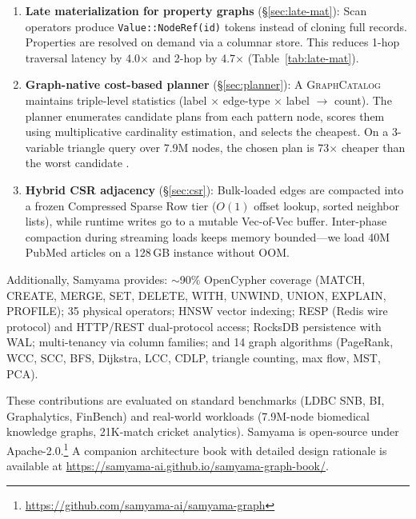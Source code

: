 \documentclass[sigconf, nonacm]{acmart}
\begin{document}
\begin{enumerate}[leftmargin=*]
  \item \textbf{Late materialization for property graphs} (\S\ref{sec:late-mat}):
    Scan operators produce \texttt{Value::NodeRef(id)} tokens instead of cloning full records.
    Properties are resolved on demand via a columnar store.
    This reduces 1-hop traversal latency by 4.0$\times$ and 2-hop by 4.7$\times$ (Table~\ref{tab:late-mat}).

  \item \textbf{Graph-native cost-based planner} (\S\ref{sec:planner}):
    A \textsc{GraphCatalog} maintains triple-level statistics (label $\times$ edge-type $\times$ label $\rightarrow$ count).
    The planner enumerates candidate plans from each pattern node, scores them using multiplicative cardinality estimation, and selects the cheapest.
    On a 3-variable triangle query over 7.9M nodes, the chosen plan is 73$\times$ cheaper than the worst candidate .

  \item \textbf{Hybrid CSR adjacency} (\S\ref{sec:csr}):
    Bulk-loaded edges are compacted into a frozen Compressed Sparse Row tier ($O(1)$ offset lookup, sorted neighbor lists),
    while runtime writes go to a mutable Vec-of-Vec buffer.
    Inter-phase compaction during streaming loads keeps memory bounded---we load 40M PubMed articles on a 128\,GB instance without OOM.
\end{enumerate}

\noindent
Additionally, Samyama provides: ${\sim}$90\% OpenCypher coverage (MATCH, CREATE, MERGE, SET, DELETE, WITH, UNWIND, UNION, EXPLAIN, PROFILE); 35 physical operators; HNSW vector indexing; RESP (Redis wire protocol) and HTTP/REST dual-protocol access; RocksDB persistence with WAL; multi-tenancy via column families; and 14 graph algorithms (PageRank, WCC, SCC, BFS, Dijkstra, LCC, CDLP, triangle counting, max flow, MST, PCA).

These contributions are evaluated on standard benchmarks (LDBC SNB, BI, Graphalytics, FinBench) and real-world workloads (7.9M-node biomedical knowledge graphs, 21K-match cricket analytics).
Samyama is open-source under Apache-2.0.\footnote{\url{https://github.com/samyama-ai/samyama-graph}}
A companion architecture book with detailed design rationale is available at \url{https://samyama-ai.github.io/samyama-graph-book/}.

\end{document}
